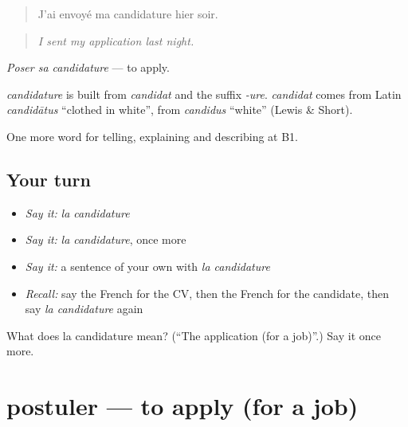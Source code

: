 \begin{quote}
J'ai envoyé ma candidature hier soir.
\end{quote}

\begin{quote}
\emph{I sent my application last night.}
\end{quote}

\emph{Poser sa candidature} — to apply.

\begin{cousinweb}
\emph{candidature} is built from \emph{candidat} and the suffix \emph{-ure}. \emph{candidat} comes from Latin \emph{candidātus} \textquotedblleft{}clothed in white\textquotedblright{}, from \emph{candidus} \textquotedblleft{}white\textquotedblright{} (Lewis \& Short).
\end{cousinweb}

\begin{grammarlens}[title={What you've built}]
One more word for telling, explaining and describing at B1.
\end{grammarlens}

\subsection*{Your turn}
\begin{itemize}
\raggedright
  \item \emph{Say it:} \emph{la candidature}
  \item \emph{Say it:} \emph{la candidature}, once more
  \item \emph{Say it:} a sentence of your own with \emph{la candidature}
  \item \emph{Recall:} say the French for the CV, then the French for the candidate, then say \emph{la candidature} again
\end{itemize}

\begin{tcolorbox}[breakable,colback=teal!4,colframe=teal!35!black,title={Before you move on}]
What does la candidature mean? (\textquotedblleft{}The application (for a job)\textquotedblright{}.) Say it once more.
\end{tcolorbox}
\section[postuler]{postuler — to apply (for a job)}

\label{lesson:FR-C354-postuler}



